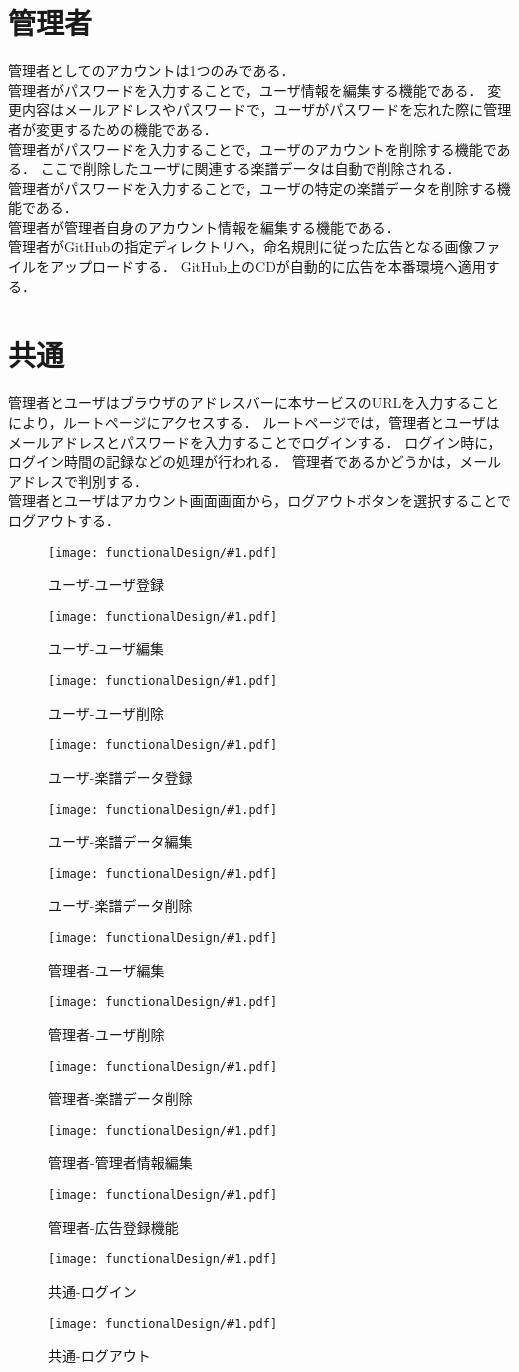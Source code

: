 \section{管理者}
管理者としてのアカウントは1つのみである．\\
管理者がパスワードを入力することで，ユーザ情報を編集する機能である．
変更内容はメールアドレスやパスワードで，ユーザがパスワードを忘れた際に管理者が変更するための機能である．\\
管理者がパスワードを入力することで，ユーザのアカウントを削除する機能である．
ここで削除したユーザに関連する楽譜データは自動で削除される．\\
管理者がパスワードを入力することで，ユーザの特定の楽譜データを削除する機能である．\\
管理者が管理者自身のアカウント情報を編集する機能である．\\
管理者がGitHubの指定ディレクトリへ，命名規則に従った広告となる画像ファイルをアップロードする．
GitHub上のCDが自動的に広告を本番環境へ適用する．
\section{共通}
管理者とユーザはブラウザのアドレスバーに本サービスのURLを入力することにより，ルートページにアクセスする．
ルートページでは，管理者とユーザはメールアドレスとパスワードを入力することでログインする．
ログイン時に，ログイン時間の記録などの処理が行われる．
管理者であるかどうかは，メールアドレスで判別する．\\
管理者とユーザはアカウント画面画面から，ログアウトボタンを選択することでログアウトする．
\newcommand{\icd}[2]{\begin{figure}[p]\centering\texttt{[image: functionalDesign/\#1.pdf]}\caption{#2}\label{#2}\end{figure}}
\icd{211-機能設計-利用者側-ユーザ登録}{ユーザ-ユーザ登録}
\icd{212-機能設計-利用者側-ユーザ編集}{ユーザ-ユーザ編集}
\icd{213-機能設計-利用者側-ユーザ削除}{ユーザ-ユーザ削除}
\icd{214-機能設計-利用者側-楽譜データ登録}{ユーザ-楽譜データ登録}
\icd{215-機能設計-利用者側-楽譜データ編集}{ユーザ-楽譜データ編集}
\icd{216-機能設計-利用者側-楽譜データ削除}{ユーザ-楽譜データ削除}
\icd{221-機能設計-管理者側-ユーザ編集}{管理者-ユーザ編集}
\icd{222-機能設計-管理者側-ユーザ削除}{管理者-ユーザ削除}
\icd{223-機能設計-管理者側-楽譜データ削除}{管理者-楽譜データ削除}
\icd{224-機能設計-管理者側-管理者情報編集機能}{管理者-管理者情報編集}
\icd{225-機能設計-管理者側-広告登録機能}{管理者-広告登録機能}
\icd{217-機能設計-利用者側-ログイン}{共通-ログイン}
\icd{218-機能設計-利用者側-ログアウト}{共通-ログアウト}

